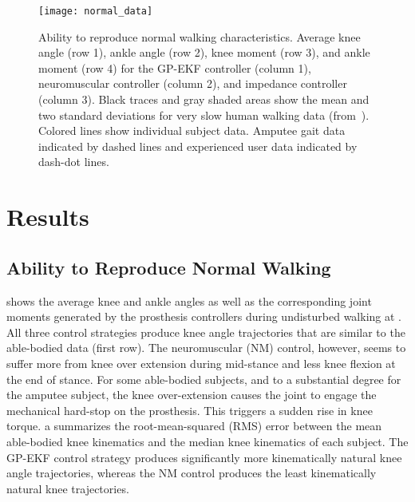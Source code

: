 \begin{figure*}[t]
    \centering
    \texttt{[image: normal\_data]} 
    \caption[Ability to reproduce normal walking characteristics]{Ability to
    reproduce normal walking characteristics. Average knee angle (row 1), ankle
    angle (row 2), knee moment (row 3), and ankle moment (row 4) for the GP-EKF
    controller (column 1), neuromuscular controller (column 2), and impedance
    controller (column 3). Black traces and gray shaded areas show the mean and
    two standard deviations for very slow human walking data
    (from~\citep{bovi2011multiple}). Colored lines show individual subject data.
    Amputee gait data indicated by dashed lines and experienced user data
    indicated by dash-dot lines.}\label{fig:controller_comparison}
\end{figure*}

\section{Results}\label{sec:results}
\subsection{Ability to Reproduce Normal Walking}

 shows the average knee and ankle angles as well
as the corresponding joint moments generated by the prosthesis controllers
during undisturbed walking at . All three control strategies
produce knee angle trajectories that are similar to the able-bodied data (first
row). The neuromuscular (NM) control, however, seems to suffer more from knee
over extension during mid-stance and less knee flexion at the end of stance. For
some able-bodied subjects, and to a substantial degree for the amputee subject,
the knee over-extension causes the joint to engage the mechanical hard-stop on
the prosthesis. This triggers a sudden rise in knee torque.
a summarizes the root-mean-squared (RMS) error
between the mean able-bodied knee kinematics and the median knee kinematics of
each subject. The GP-EKF control strategy produces significantly more
kinematically natural knee angle trajectories, whereas the NM control produces
the least kinematically natural knee trajectories. 

